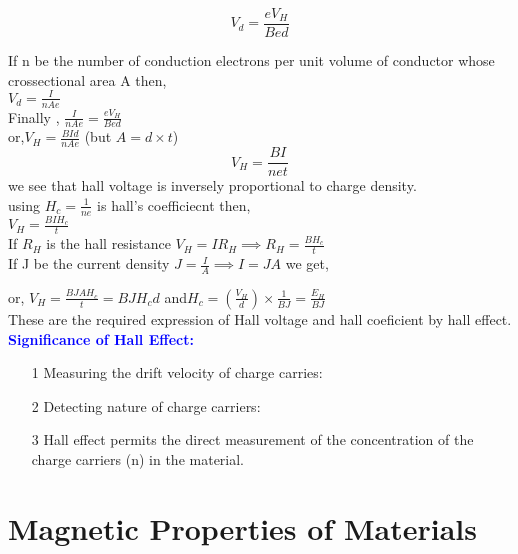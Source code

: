 \documentclass{beamer}
\begin{document}
\begin{frame}
\begin{equation}
V_d=\frac{eV_H}{Bed}
\end{equation}

If n be the number of conduction electrons per unit volume of conductor whose crossectional area A then, \\
\hspace{1cm} $V_d=\frac{I}{nAe}$\\
\hspace{3cm}  Finally , $\frac{I}{nAe}=\frac{eV_H}{Bed}$\\
or,$V_H=\frac{BId}{nAe} $ (but $A=d\times t$)\\
\[
V_H=\frac{BI}{net}
\]
we see that hall voltage is inversely proportional to charge density.\\
using $H_c=\frac{1}{ne}$ is hall's coefficiecnt then,\\
\hspace{2cm} $V_H=\frac{BIH_c}{t}$\\
If $R_H$ is the hall resistance $V_H=IR_H \implies R_H=\frac{BH_c}{t}$\\
If J be the current density $J=\frac{I}{A} \implies I=JA $ we get, \\
 
\end{frame}

\begin{frame}
\hspace{1cm} or,  $V_H=\frac{BJAH_c}{t}=BJH_c d$ and$ H_c=(\frac{V_H}{d})\times \frac{1}{BJ}=\frac{E_H}{BJ}$\\
These are the required expression of Hall voltage and hall coeficient by hall effect.\\
\textcolor{blue}{\textbf{Significance of Hall Effect:}}\\
\begin{itemize}
\item[1] Measuring the drift velocity of charge carries:
\item[2] Detecting nature of charge carriers:
\item[3] Hall effect permits the direct measurement of the concentration of the charge carriers (n) in the material.
\end{itemize}

\end{frame}

\section{Magnetic Properties of Materials}
\end{document}
